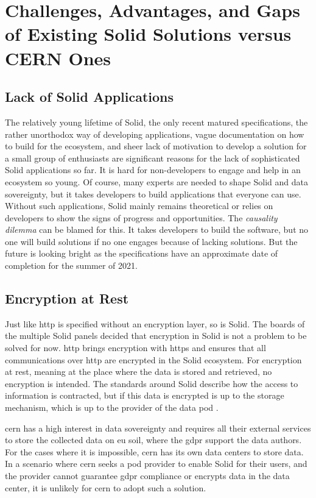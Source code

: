 \section{Challenges, Advantages, and Gaps of Existing Solid Solutions versus CERN Ones}

\subsection{Lack of Solid Applications}\label{challenges:lack}

The relatively young lifetime of Solid, the only recent matured specifications, the rather unorthodox way of developing applications, vague documentation on how to build for the ecosystem, and sheer lack of motivation to develop a solution for a small group of enthusiasts are significant reasons for the lack of sophisticated Solid applications so far. It is hard for non-developers to engage and help in an ecosystem so young. Of course, many experts are needed to shape Solid and data sovereignty, but it takes developers to build applications that everyone can use. Without such applications, Solid mainly remains theoretical or relies on developers to show the signs of progress and opportunities. The \textit{causality dilemma} can be blamed for this. It takes developers to build the software, but no one will build solutions if no one engages because of lacking solutions. But the future is looking bright as the specifications have an approximate date of completion for the summer of 2021.

\subsection{Encryption at Rest}

Just like \gls{http} is specified without an encryption layer, so is Solid. The boards of the multiple Solid panels \cite{solid-panels} decided that encryption in Solid is not a problem to be solved for now. \gls{http} brings encryption with \gls{https} and ensures that all communications over \gls{http} are encrypted in the Solid ecosystem. For encryption at rest, meaning at the place where the data is stored and retrieved, no encryption is intended. The standards around Solid describe how the access to information is contracted, but if this data is encrypted is up to the storage mechanism, which is up to the provider of the data pod \cite{solidproject-faqs}.

\gls{cern} has a high interest in data sovereignty and requires all their external services to store the collected data on \gls{eu} soil, where the \gls{gdpr} support the data authors. For the cases where it is impossible, \gls{cern} has its own data centers to store data. In a scenario where \gls{cern} seeks a pod provider to enable Solid for their users, and the provider cannot guarantee \gls{gdpr} compliance or encrypts data in the data center, it is unlikely for \gls{cern} to adopt such a solution.

